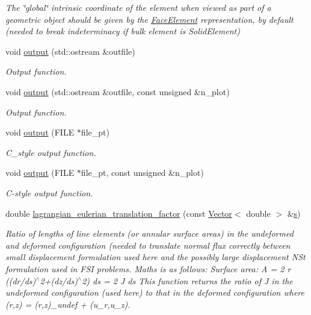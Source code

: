 \begin{DoxyCompactItemize}
\begin{DoxyCompactList}\small\item\em The \char`\"{}global\char`\"{} intrinsic coordinate of the element when viewed as part of a geometric object should be given by the \hyperlink{classoomph_1_1FaceElement}{Face\+Element} representation, by default (needed to break indeterminacy if bulk element is Solid\+Element) \end{DoxyCompactList}\item 
void \hyperlink{classoomph_1_1AxisymmetricPoroelasticityTractionElement_a8a8c5836245d55930bd54dc5a12d518a}{output} (std\+::ostream \&outfile)
\begin{DoxyCompactList}\small\item\em Output function. \end{DoxyCompactList}\item 
void \hyperlink{classoomph_1_1AxisymmetricPoroelasticityTractionElement_ac39b3c4245c9ac3a075a9686723d9360}{output} (std\+::ostream \&outfile, const unsigned \&n\+\_\+plot)
\begin{DoxyCompactList}\small\item\em Output function. \end{DoxyCompactList}\item 
void \hyperlink{classoomph_1_1AxisymmetricPoroelasticityTractionElement_a35244154ae620644ad434f7dc34173da}{output} (F\+I\+LE $\ast$file\+\_\+pt)
\begin{DoxyCompactList}\small\item\em C\+\_\+style output function. \end{DoxyCompactList}\item 
void \hyperlink{classoomph_1_1AxisymmetricPoroelasticityTractionElement_ac2efa0fcd5c5d4fe2a0772a181c81f97}{output} (F\+I\+LE $\ast$file\+\_\+pt, const unsigned \&n\+\_\+plot)
\begin{DoxyCompactList}\small\item\em C-\/style output function. \end{DoxyCompactList}\item 
double \hyperlink{classoomph_1_1AxisymmetricPoroelasticityTractionElement_a74bcc2448d472585579da00fb1a79da7}{lagrangian\+\_\+eulerian\+\_\+translation\+\_\+factor} (const \hyperlink{classoomph_1_1Vector}{Vector}$<$ double $>$ \&\hyperlink{cfortran_8h_ab7123126e4885ef647dd9c6e3807a21c}{s})
\begin{DoxyCompactList}\small\item\em Ratio of lengths of line elements (or annular surface areas) in the undeformed and deformed configuration (needed to translate normal flux correctly between small displacement formulation used here and the possibly large displacement N\+St formulation used in F\+SI problems. Maths is as follows\+: Surface area\+: A = 2   r ((dr/ds)$^\wedge$2+(dz/ds)$^\wedge$2) ds = 2   J ds This function returns the ratio of J in the undeformed configuration (used here) to that in the deformed configuration where (r,z) = (r,z)\+\_\+undef + (u\+\_\+r,u\+\_\+z). \end{DoxyCompactList}\item 

\end{DoxyCompactItemize}
